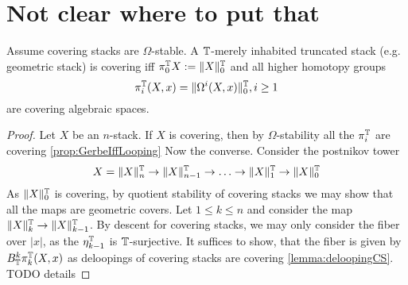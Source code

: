 \documentclass{article}
\begin{document}
\section{Not clear where to put that}
\begin{prop}
	Assume covering stacks are $\Omega$-stable.
	A $\mathbb{T}$-merely inhabited truncated stack (e.g. geometric stack) is covering iff $\pi_0^{\mathbb{T}} X := \|X\|_0^{\mathbb{T}}$ and all higher homotopy groups 
	\[
	\pi_i^{\mathbb{T}}(X,x) = \|\Omega^i (X , x)\|_0^{\mathbb{T}} , i \ge 1
	\]
	are covering algebraic spaces.
\end{prop}
\begin{proof}
	Let $X$ be an $n$-stack.
	If $X$ is covering, then by $\Omega$-stability all the $\pi_i^{\mathbb{T}}$ are covering \ref{prop:GerbeIffLooping} Now the converse.
	Consider the postnikov tower
	\[
	X = \|X\|_n^{\mathbb{T}} \to \|X\|_{n-1}^{\mathbb{T}} \to \hdots \to \|X\|_1^{\mathbb{T}} \to \|X\|_0^{\mathbb{T}} 
	\]
	As $\|X\|_0^{\mathbb{T}}$ is covering, by quotient stability of covering stacks we may show that all the maps are geometric covers. 
	Let $1 \le k \le n$ and consider the map $\|X\|_{k}^{\mathbb{T}} \to \|X\|_{k-1}^{\mathbb{T}}$. By descent for covering stacks, we may only consider the fiber over $|x|$, as the $\eta_{k-1}^{\mathbb{T}}$ is $\mathbb{T}$-surjective. 
	It suffices to show, that the fiber is given by $B_{\mathbb{T}}^k \pi^{\mathbb{T}}_k(X,x)$ as deloopings of covering stacks are covering \ref{lemma:deloopingCS}.\\	
	TODO details		
\end{proof}
\end{document}
